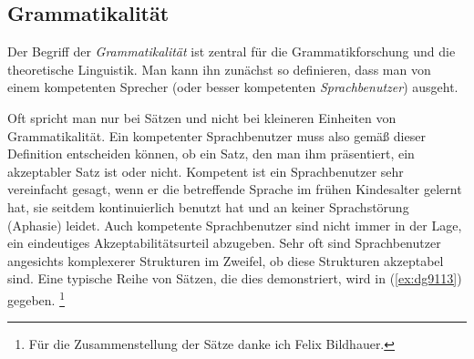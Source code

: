 \subsection{Grammatikalität}

\label{sec:grammungramm}
\label{sec:grammatikalitaet}


Der Begriff der \textit{Grammatikalität} ist zentral für die Grammatikforschung und die theoretische Linguistik.
Man kann ihn zunächst so definieren, dass man von einem kompetenten Sprecher (oder besser kompetenten \textit{Sprachbenutzer}) ausgeht.


Oft spricht man nur bei Sätzen und nicht bei kleineren Einheiten von Grammatikalität.
Ein kompetenter Sprachbenutzer muss also gemäß dieser Definition entscheiden können, ob ein Satz, den man ihm präsentiert, ein akzeptabler Satz ist oder nicht.
Kompetent ist ein Sprachbenutzer sehr vereinfacht gesagt, wenn er die betreffende Sprache im frühen Kindesalter gelernt hat, sie seitdem kontinuierlich benutzt hat und an keiner Sprachstörung (Aphasie) leidet.
Auch kompetente Sprachbenutzer sind nicht immer in der Lage, ein eindeutiges Akzeptabilitätsurteil abzugeben.
Sehr oft sind Sprachbenutzer angesichts komplexerer Strukturen im Zweifel, ob diese Strukturen akzeptabel sind.
Eine typische Reihe von Sätzen, die dies demonstriert, wird in (\ref{ex:dg9113}) gegeben.%
\footnote{Für die Zusammenstellung der Sätze danke ich Felix Bildhauer.}

\begin{exe}
  \ex\label{ex:dg9113}
  \begin{xlist}
  \end{xlist}
\end{exe}


